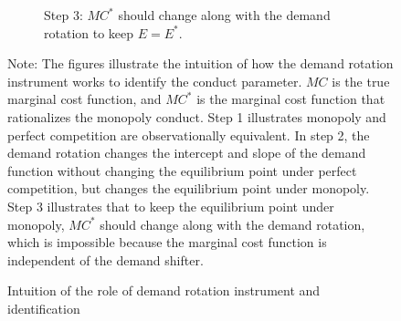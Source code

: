 \documentclass[11pt, a4paper]{article}
\theoremstyle{remark}
\begin{document}
\begin{figure}[p!]
\begin{center}
\begin{subfigure}[b]{0.5\textwidth}
            \caption{Step 3: $MC^{*}$ should change along with the demand rotation to keep $E = E^{*}$.}
            \label{fig:identification_example_step_3}
        \end{subfigure}
    \end{center}
    \caption{Intuition of the role of demand rotation instrument and identification}
    \label{fig:identification_example}
    \vspace{2mm}
    \footnotesize
    Note: The figures illustrate the intuition of how the demand rotation instrument works to identify the conduct parameter.
    $MC$ is the true marginal cost function, and $MC^{*}$ is the marginal cost function that rationalizes the monopoly conduct.
    Step 1 illustrates monopoly and perfect competition are observationally equivalent.
    In step 2, the demand rotation changes the intercept and slope of the demand function without changing the equilibrium point under perfect competition, but changes the equilibrium point under monopoly.
    Step 3 illustrates that to keep the equilibrium point under monopoly, $MC^{*}$ should change along with the demand rotation, which is impossible because the marginal cost function is independent of the demand shifter.
\end{figure}
\end{document}
